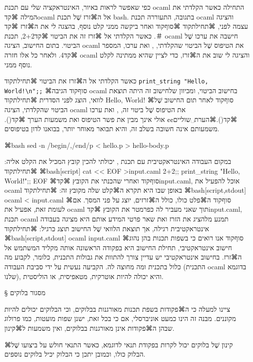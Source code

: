 כפי שאפשר לראות באיור, האינטראקציה שלי עם תכנת ocaml התחילה כאשר הקלדתי
את המילה ⌘קד{ocaml} אל ה⌘זרז שֶׁל תכנת bash.
בתגובה, התעוררה תכנת ocaml והציגה עצמה לפני,
⌘תחילת{קוד}
⌘סוף{קוד}
ואחר ביקשה ממני קלט נוסף, בהצגה לי את ה⌘זרז ⌘קד{＃}.
 כאשר הקלדתי אל ⌘זרז זה את הביטוי ⌘קד{2+2},
 תכנת ocaml חישבה את ערכו שֶׁל הביטוי.
 בתום החישוב, הציגה ocaml את הטיפוס שֶׁל הביטוי שהקלדתי, ,
 ואת ערכו, המספר ⌘קד{4}. ולאחר כל אלו חזרה ocaml והציגה לי שוב את ה⌘זרז, כדי לציין שהיא ממתינה
 לקלט נוסף ממני.

 כאשר הקלדתי אל ה⌘זרז את הביטוי
 ⌘תחילת{קוד}
 \let\ttfamily=\listingsfont
 \verb+print_string "Hello, World!\n";;+
 ⌘סוף{קוד}
 הגיבה ocaml בחישוב הביטוי, ומכיוון שלחישוב זה היתה תוצאת לוואי, הוצג לפני
 הסדרית
 ⌘תחילת{קוד}
 \listingsfont
 Hello, World!
 ⌘סוף{קוד}
 לאחר תום החישוב שֶׁל הביטוי שהקלדתי, הציגה ocaml את הטיפוס שֶׁל ביטוי זה, , ואת ערכו
 ⌘קד{()}.⌘הערת␣שוליים{¢¢
   אולי אינך מבין את פשר הטיפוס  ואת משמעות הערך ⌘קד{()}. משמעותם
 אינה חשובה בשלב זה, והיא תבואר מאוחר יותר, בבואנו לדון בטיפוסים.}

⌘bash
sed -n /begin/,/end/p < hello.p > hello-body.p
\END

במקום העבודה האינטראקטיבית עם תכנת ,
יכולתי להכין קובץ המכיל את הקלט אליה:
⌘תחילת{קוד}
⌘bash[script]
cat << EOF >input.caml
2+2;;
print_string "Hello, World!\n";;
EOF
\END
⌘סוף{קוד}
ואחרי שהכנתי את הקובץ ⌘קד{input.caml}, אוכל להפעיל את ocaml באופן שבו היא תקרא
ה⌘קלט שלה מקובץ זה:
⌘תחילת{קוד}
⌘bash[script,stdout]
ocaml < input.caml
\END
⌘סוף{קוד}
ה⌘פלט כולו, כולל ה⌘זרזים, יוצג על פני המסך. אם לעומת זאת, אפעיל את ocaml
תוך שאני מעביר לה כפרמטר את הקובץ ⌘קד{input.caml}, תכנת ocaml תמנע מלהציג
את הזרז ואת שאר פרטי המידע אותם היא מציגה בעבודה אינטראקטיבית רגילה, אך
תוצאת הלוואי שֶׁל החישוב תוצג כרגיל:
⌘תחילת{קוד}
⌘bash[script,stdout]
ocaml input.caml
\END
⌘סוף{קוד}
אנו רואים כי בשפות תכנות בהן נהוג חישוב אינטראקטיבי, תחילת החישוב היא בפקודה
הראשונה אותה מקליד המשתמש אל ה⌘זרז. בחישוב אינטראקטיבי יש עדיין צורך להתוות את גבולות התכנית,
כלומר, לקבוע מה כלול בתכנית ומה מחוצה לה. הקביעה נעשית על ידי סביבת העבודה (התכנית ocaml
בדוגמא שלנו), והיא יכולה להיות אוטרקית, מטאפיסית, או הוליסטית.

§ מסגור בלוקים

ציינו למעלה כי ה⌘פקודות בשפת תכנות מאורגנות בבלוקים, וכי הבלוקים יכולים להיות
מקוננים. מבנה זה הינו כמעט אוניברסלי, אם כי בכל זאת, ישנן שפות מועטות, כמו
פרולוג שבהן ה⌘פקודות אינן מאורגנות בבלוקים, ואין משמעות ל⌘קינון.

⌘קינון שֶׁל בלוקים יכול לקרות בפקודת תנאי לדוגמא, כאשר התנאי חולש על ביצועו שֶׁל
הבלוק כולו, וכמובן יתכן כי הבלוק יכיל בלוקים נוספים.

